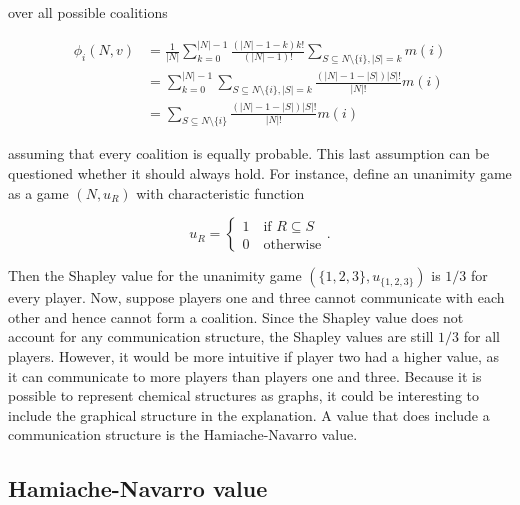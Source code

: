 over all possible coalitions


\begin{equation}
	\begin{aligned}
		\label{eq:Shapley}
		\phi_i(N, v) & = \frac{1}{|N|} \sum_{k=0}^{|N|-1} \frac{\left(|N| - 1 - k\right)k!}{\left(|N| - 1\right)!} \sum_{S \subseteq N \setminus \{i\}, |S| = k} m(i) \\
		             & = \sum_{k=0}^{|N| - 1} \sum_{S \subseteq N \setminus \{i\}, |S| = k} \frac{\left(|N| - 1 - |S|\right)|S|!}{|N|!} m(i)                          \\
		             & = \sum_{S \subseteq N \setminus \{i\}} \frac{\left(|N| - 1 - |S|\right)|S|!}{|N|!} m(i)
	\end{aligned}
\end{equation}


assuming that every coalition is equally probable. This last assumption can be questioned whether it should
always hold. For instance, define an unanimity game as a game $(N, u_R)$ with characteristic function


\begin{equation}
	u_R = \begin{cases}
		1 \quad \text{if } R \subseteq S \\
		0 \quad \text{otherwise}
	\end{cases}.
\end{equation}


Then the Shapley value for the unanimity game $(\{1, 2, 3\}, u_{\{1,2,3\}})$ is $1/3$ for every player.\cite{hamiache_value_1999}
Now, suppose players one and three cannot communicate with each other and hence cannot form a coalition.
Since the Shapley value does not account for any communication structure, the Shapley values are still
$1/3$ for all players. However, it would be more intuitive if player two had a higher value, as it can
communicate to more players than players one and three. Because it is possible to represent chemical
structures as graphs, it could be interesting to include the graphical structure in the explanation. A
value that does include a communication structure is the Hamiache-Navarro value.\cite{hamiache_value_1999, hamiache_associated_2020}


\subsection{Hamiache-Navarro value}



